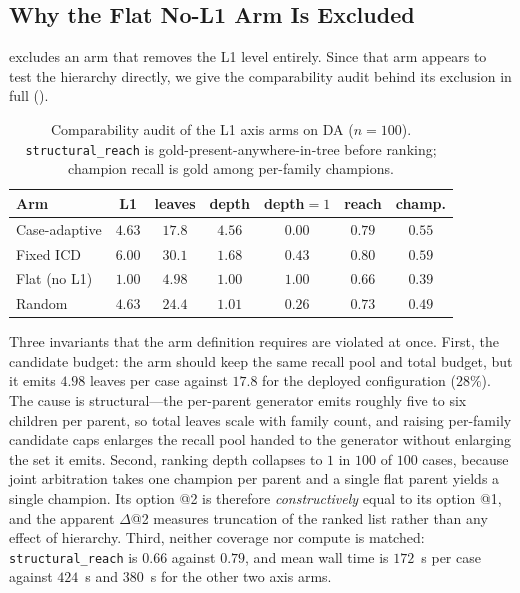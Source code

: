 \subsection{Why the Flat No-L1 Arm Is Excluded}
\label{app:ab02}

 excludes an arm that removes the L1 level entirely.
Since that arm appears to test the hierarchy directly, we give the comparability audit behind its exclusion in full ().

\begin{table}[t]
\centering
\small
\caption{Comparability audit of the L1 axis arms on DA ($n{=}100$). \texttt{structural\_reach} is gold-present-anywhere-in-tree before ranking; champion recall is gold among per-family champions.}
\label{tab:ab02}
\begin{tabular}{lcccccc}
\toprule
Arm & L1 & leaves & depth & depth${=}1$ & reach & champ. \\
\midrule
Case-adaptive & $4.63$ & $17.8$ & $4.56$ & $0.00$ & $0.79$ & $0.55$ \\
Fixed ICD & $6.00$ & $30.1$ & $1.68$ & $0.43$ & $0.80$ & $0.59$ \\
Flat (no L1) & $1.00$ & $4.98$ & $1.00$ & $1.00$ & $0.66$ & $0.39$ \\
Random & $4.63$ & $24.4$ & $1.01$ & $0.26$ & $0.73$ & $0.49$ \\
\bottomrule
\end{tabular}
\end{table}

Three invariants that the arm definition requires are violated at once.
First, the candidate budget: the arm should keep the same recall pool and total budget, but it emits $4.98$ leaves per case against $17.8$ for the deployed configuration ($28\%$).
The cause is structural---the per-parent generator emits roughly five to six children per parent, so total leaves scale with family count, and raising per-family candidate caps enlarges the recall pool handed to the generator without enlarging the set it emits.
Second, ranking depth collapses to $1$ in $100$ of $100$ cases, because joint arbitration takes one champion per parent and a single flat parent yields a single champion.
Its option @2 is therefore \emph{constructively} equal to its option @1, and the apparent $\Delta$@2 measures truncation of the ranked list rather than any effect of hierarchy.
Third, neither coverage nor compute is matched: \texttt{structural\_reach} is $0.66$ against $0.79$, and mean wall time is $172$~s per case against $424$~s and $380$~s for the other two axis arms.

